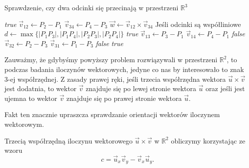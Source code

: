 \begin{algorithm}[H]
	\caption{Sprawdzenie, czy dwa odcinki się przecinają w przestrzeni $\mathbb{R}^3$}
	\begin{algorithmic}[1]
		\State \Return \textit{true}
		\EndIf
		\State $\vec{v}_{12} \gets P_2 - P_1$
		\State $\vec{v}_{34} \gets P_4 - P_3$
		\State $\vec{w} \gets \vec{v}_{12} \times \vec{v}_{34}$	
		 \Comment Jeśli odcinki są współliniowe
		\State $d \gets \max\{|P_1P_3|, |P_1P_4|, |P_2P_3|, |P_2P_4|\}$
		\State \Return \textit{true}
		\EndIf
		\EndIf
		\State $\vec{v}_{13} \gets P_3 - P_1$
		\State $\vec{v}_{14} \gets P_4 - P_1$
		\State \Return \textit{false}
		\EndIf
		\State $\vec{v}_{32} \gets P_2 - P_3$
		\State $\vec{v}_{31} \gets P_1 - P_3$
		\State \Return \textit{false}
		\EndIf
		\State \Return \textit{true}
		\EndProcedure
	\end{algorithmic}
	\label{segment_intersection_r3}
\end{algorithm}

Zauważmy, że gdybyśmy powyższy problem rozwiązywali w przestrzeni $\mathbb{R}^2$,
to podczas badania iloczynów wektorowych, jedyne co nas by interesowało
to znak 3-ej współrzędnej. Z zasady prawej ręki, jeśli
trzecia współrzędna wektora 
$\vec{u} \times \vec{v}$ jest dodatnia, to wektor $\vec{v}$
znajduje się po lewej stronie wektora $\vec{u}$ oraz jeśli 
jest ujemna to wektor $\vec{v}$
znajduje się po prawej stronie wektora $\vec{u}$. 

Fakt ten znacznie upraszcza sprawdzanie orientacji wektorów iloczynem wektorowym.

Trzecią współrzędną iloczynu wektorowego $\vec{u} \times \vec{v}$ w $\mathbb{R}^2$
obliczymy korzystając ze wzoru
\[c = \vec{u}_x \vec{v}_y - \vec{v}_x \vec{u}_y.\]



